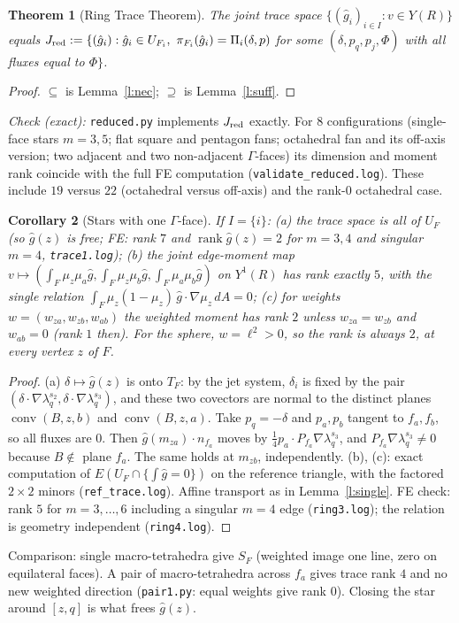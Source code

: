 \documentclass[11pt]{article}
\newtheorem{theorem}{Theorem}[section]
\newtheorem{corollary}[theorem]{Corollary}
\theoremstyle{definition}
\newcommand{\gh}{\hat g}
\DeclareMathOperator{\conv}{conv}
\begin{document}
\begin{theorem}[Ring Trace Theorem]\label{t:trace}
The joint trace space $\{(\gh_i)_{i\in I}:v\in Y(R)\}$ equals
$J_{\rm red}:=\{(\gh_i):\gh_i\in U_{F_i},\ \pi_{F_i}(\gh_i)=\Pi_i(\delta,p)$ for some $(\delta,p_q,p_j,\Phi)$ with all fluxes equal to $\Phi\}$.
\end{theorem}
\begin{proof}
$\subseteq$ is Lemma~\ref{l:nec}; $\supseteq$ is Lemma~\ref{l:suff}.
\end{proof}
\emph{Check (exact):} \texttt{reduced.py} implements $J_{\rm red}$ exactly. For $8$ configurations (single-face stars $m=3,5$; flat square and pentagon fans; octahedral fan and its off-axis version; two adjacent and two non-adjacent $\Gamma$-faces) its dimension and moment rank coincide with the full FE computation (\texttt{validate\_reduced.log}). These include $19$ versus $22$ (octahedral versus off-axis) and the rank-$0$ octahedral case.

\begin{corollary}[Stars with one $\Gamma$-face]\label{c:single}
If $I=\{i\}$:
(a) the trace space is all of $U_F$ (so $\gh(z)$ is free; FE: rank $7$ and $\operatorname{rank}\gh(z)=2$ for $m=3,4$ and singular $m=4$, \texttt{trace1.log});
(b) the joint edge-moment map $v\mapsto(\int_F\mu_z\mu_a\gh,\int_F\mu_z\mu_b\gh,\int_F\mu_a\mu_b\gh)$ on $Y^1(R)$ has rank exactly $5$, with the single relation $\int_F\mu_z(1-\mu_z)\,\gh\cdot\nabla\mu_z\,dA=0$;
(c) for weights $w=(w_{za},w_{zb},w_{ab})$ the weighted moment has rank $2$ unless $w_{za}=w_{zb}$ and $w_{ab}=0$ (rank $1$ then). For the sphere, $w=\ell^2>0$, so the rank is always $2$, at every vertex $z$ of $F$.
\end{corollary}
\begin{proof}
(a) $\delta\mapsto\gh(z)$ is onto $T_F$: by the jet system, $\delta_i$ is fixed by the pair $(\delta\cdot\nabla\lambda_q^{s_2},\delta\cdot\nabla\lambda_q^{s_3})$, and these two covectors are normal to the distinct planes $\conv(B,z,b)$ and $\conv(B,z,a)$. Take $p_q=-\delta$ and $p_a,p_b$ tangent to $f_a,f_b$, so all fluxes are $0$. Then $\gh(m_{za})\cdot n_{f_a}$ moves by $\frac14p_a\cdot P_{f_a}\nabla\lambda_q^{s_3}$, and $P_{f_a}\nabla\lambda_q^{s_3}\ne0$ because $B\notin$ plane $f_a$. The same holds at $m_{zb}$, independently. (b), (c): exact computation of $E(U_F\cap\{\int\gh=0\})$ on the reference triangle, with the factored $2\times2$ minors (\texttt{ref\_trace.log}). Affine transport as in Lemma~\ref{l:single}. FE check: rank $5$ for $m=3,\dots,6$ including a singular $m=4$ edge (\texttt{ring3.log}); the relation is geometry independent (\texttt{ring4.log}).
\end{proof}
Comparison: single macro-tetrahedra give $S_F$ (weighted image one line, zero on equilateral faces). A pair of macro-tetrahedra across $f_a$ gives trace rank $4$ and no new weighted direction (\texttt{pair1.py}: equal weights give rank $0$). Closing the star around $[z,q]$ is what frees $\gh(z)$.
\end{document}
